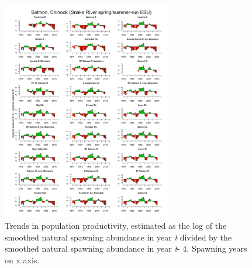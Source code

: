 \documentclass[
  letterpaper,
  oneside,
  open=any]{scrbook}
\begin{document}
\begin{figure}

{\centering \includegraphics[width=2.92in,height=\textheight]{content/Interior_Columbia/../../media/image26.png}

}

\caption{\label{fig-SnR-SS-productivity-trends}Trends in population
productivity, estimated as the log of the smoothed natural spawning
abundance in year \emph{t} divided by the smoothed natural spawning
abundance in year \emph{t}- 4. Spawning years on x axis.}

\end{figure}
\end{document}

